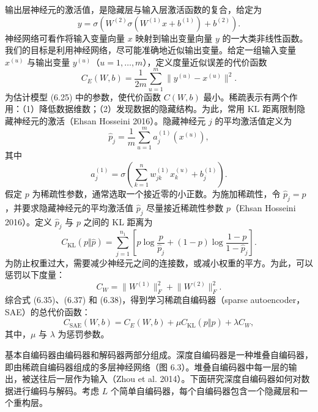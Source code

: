 输出层神经元的激活值，是隐藏层与输入层激活函数的复合，给定为
\begin{equation}
y=\sigma\left(W^{(2)}\sigma(W^{(1)}x+b^{(1)})+b^{(2)}\right).
\tag{6.34}
\end{equation}
神经网络可看作将输入变量向量 $x$ 映射到输出变量向量 $y$ 的一大类非线性函数。我们的目标是利用神经网络，尽可能准确地近似输出变量。给定一组输入变量 $x^{(u)}$ 与输出变量 $y^{(u)}$（$u=1,\ldots,m$），定义度量近似误差的代价函数
\begin{equation}
C_E(W,b)=\frac1{2m}\sum_{u=1}^m\lVert y^{(u)}-x^{(u)}\rVert^2.
\tag{6.35}
\end{equation}
为估计模型 (6.25) 中的参数，使代价函数 $C(W,b)$ 最小。稀疏表示有两个作用：（1）降低数据维数；（2）发现数据的隐藏结构。为此，常用 KL 距离限制隐藏神经元的激活（Ehsan Hosseini 2016）。隐藏神经元 $j$ 的平均激活值定义为
\begin{equation}
\widehat p_j=\frac1m\sum_{u=1}^ma_j^{(1)}(x^{(u)}),
\tag{6.36}
\end{equation}
其中
\[
a_j^{(1)}=\sigma\left(\sum_{k=1}^nw_{jk}^{(1)}x_k^{(u)}+b_j^{(1)}\right).
\]
假定 $p$ 为稀疏性参数，通常选取一个接近零的小正数。为施加稀疏性，令 $\widehat p_j=p$，并要求隐藏神经元的平均激活值 $\widehat p_j$ 尽量接近稀疏性参数 $p$（Ehsan Hosseini 2016）。定义 $\widehat p_j$ 与 $p$ 之间的 KL 距离为
\begin{equation}
C_{\mathrm{KL}}(p\Vert\widehat p)=\sum_{j=1}^{n_1}
\left[p\log\frac p{\widehat p_j}+(1-p)\log\frac{1-p}{1-\widehat p_j}\right].
\tag{6.37}
\end{equation}
为防止权重过大，需要减少神经元之间的连接数，或减小权重的平方。为此，可以惩罚以下度量：
\begin{equation}
C_W=\lVert W^{(1)}\rVert_F^2+\lVert W^{(2)}\rVert_F^2.
\tag{6.38}
\end{equation}
综合式 (6.35)、(6.37) 和 (6.38)，得到学习稀疏自编码器（sparse autoencoder，SAE）的总代价函数：
\begin{equation}
C_{\mathrm{SAE}}(W,b)=C_E(W,b)+\mu C_{\mathrm{KL}}(p\Vert\widehat p)+\lambda C_W,
\tag{6.39}
\end{equation}
其中，$\mu$ 与 $\lambda$ 为惩罚参数。


基本自编码器由编码器和解码器两部分组成。深度自编码器是一种堆叠自编码器，即由稀疏自编码器组成的多层神经网络（图 6.3）。堆叠自编码器中每一层的输出，被送往后一层作为输入（Zhou et al. 2014）。下面研究深度自编码器如何对数据进行编码与解码。考虑 $L$ 个简单自编码器，每个自编码器包含一个隐藏层和一个重构层。

